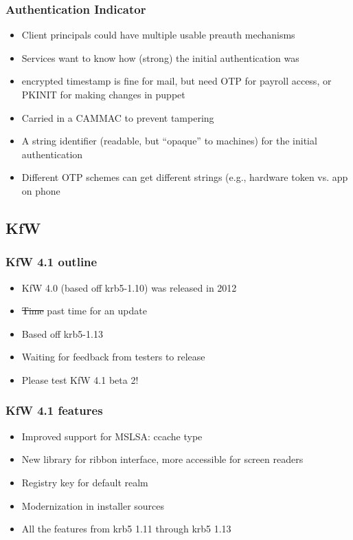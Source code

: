 \documentclass{beamer}
\begin{document}
\begin{frame}
\frametitle{Authentication Indicator}
\begin{itemize}
\item{Client principals could have multiple usable preauth mechanisms}
\item{Services want to know how (strong) the initial authentication was}
\item{encrypted timestamp is fine for mail, but need OTP for payroll access,
	or PKINIT for making changes in puppet}
\item{Carried in a CAMMAC to prevent tampering}
\item{A string identifier (readable, but ``opaque'' to machines) for
	the initial authentication}
\item{Different OTP schemes can get different strings (e.g., hardware token
	vs. app on phone}
\end{itemize}
\end{frame}

\subsection{KfW}

\begin{frame}
\frametitle{KfW 4.1 outline}
\begin{itemize}
\item{KfW 4.0 (based off krb5-1.10) was released in 2012}
\item{\sout{Time} past time for an update}
\item{Based off krb5-1.13}
\item{Waiting for feedback from testers to release}
\item{Please test KfW 4.1 beta 2!}
\end{itemize}
\end{frame}

\begin{frame}
\frametitle{KfW 4.1 features}
\begin{itemize}
\item{Improved support for MSLSA: ccache type}
\item{New library for ribbon interface, more accessible for screen readers}
\item{Registry key for default realm}
\item{Modernization in installer sources}
\item{All the features from krb5 1.11 through krb5 1.13}
\end{itemize}
\end{frame}
\end{document}
